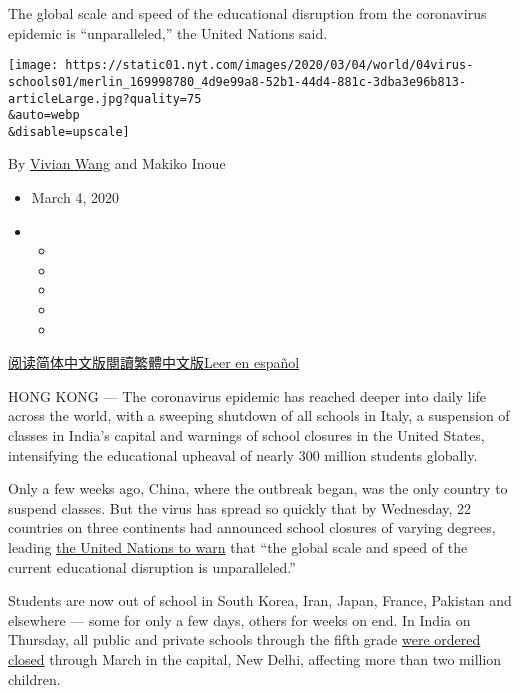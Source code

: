 The global scale and speed of the educational disruption from the
coronavirus epidemic is ``unparalleled,'' the United Nations said.

\texttt{[image: https://static01.nyt.com/images/2020/03/04/world/04virus-schools01/merlin\_169998780\_4d9e99a8-52b1-44d4-881c-3dba3e96b813-articleLarge.jpg?quality=75\\\&auto=webp\\\&disable=upscale]}

By \href{https://www.nytimes.com/by/vivian-wang}{Vivian Wang} and Makiko
Inoue

\begin{itemize}
\item
  March 4, 2020
\item
  \begin{itemize}
  \item
  \item
  \item
  \item
  \item
  \end{itemize}
\end{itemize}

\href{https://cn.nytimes.com/education/20200305/coronavirus-schools-closed/}{阅读简体中文版}\href{https://cn.nytimes.com/education/20200305/coronavirus-schools-closed/zh-hant/}{閱讀繁體中文版}\href{https://www.nytimes.com/es/2020/03/05/espanol/mundo/suspension-clases-coronavirus.html}{Leer
en español}

HONG KONG --- The coronavirus epidemic has reached deeper into daily
life across the world, with a sweeping shutdown of all schools in Italy,
a suspension of classes in India's capital and warnings of school
closures in the United States, intensifying the educational upheaval of
nearly 300 million students globally.

Only a few weeks ago, China, where the outbreak began, was the only
country to suspend classes. But the virus has spread so quickly that by
Wednesday, 22 countries on three continents had announced school
closures of varying degrees, leading
\href{https://en.unesco.org/news/290-million-students-out-school-due-covid-19-unesco-releases-first-global-numbers-and-mobilizes}{the
United Nations to warn} that ``the global scale and speed of the current
educational disruption is unparalleled.''

Students are now out of school in South Korea, Iran, Japan, France,
Pakistan and elsewhere --- some for only a few days, others for weeks on
end. In India on Thursday, all public and private schools through the
fifth grade
\href{https://www.nytimes.com/2020/03/05/world/coronavirus-news.html?action=click\&module=Top\%20Stories\&pgtype=Homepage\#link-4c11ca8b}{were
ordered closed} through March in the capital, New Delhi, affecting more
than two million children.

